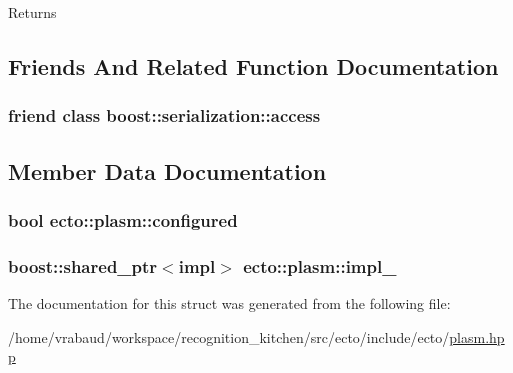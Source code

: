 \begin{DoxyReturn}{Returns}

\end{DoxyReturn}


\subsection{Friends And Related Function Documentation}
\subsubsection[{\texorpdfstring{boost\+::serialization\+::access}{boost::serialization::access}}]{\setlength{\rightskip}{0pt plus 5cm}friend class boost\+::serialization\+::access\hspace{0.3cm}{\ttfamily [friend]}}\hypertarget{structecto_1_1plasm_ac98d07dd8f7b70e16ccb9a01abf56b9c}{}\label{structecto_1_1plasm_ac98d07dd8f7b70e16ccb9a01abf56b9c}


\subsection{Member Data Documentation}
\subsubsection[{\texorpdfstring{configured}{configured}}]{\setlength{\rightskip}{0pt plus 5cm}bool ecto\+::plasm\+::configured\hspace{0.3cm}{\ttfamily [private]}}\hypertarget{structecto_1_1plasm_a8d074da8290587fab0ed04d5cfe3f6b1}{}\label{structecto_1_1plasm_a8d074da8290587fab0ed04d5cfe3f6b1}
\subsubsection[{\texorpdfstring{impl\+\_\+}{impl_}}]{\setlength{\rightskip}{0pt plus 5cm}boost\+::shared\+\_\+ptr$<$impl$>$ ecto\+::plasm\+::impl\+\_\+\hspace{0.3cm}{\ttfamily [private]}}\hypertarget{structecto_1_1plasm_a4cfd41e9dc82039a75970755565b2513}{}\label{structecto_1_1plasm_a4cfd41e9dc82039a75970755565b2513}


The documentation for this struct was generated from the following file\+:\begin{DoxyCompactItemize}
\item 
/home/vrabaud/workspace/recognition\+\_\+kitchen/src/ecto/include/ecto/\hyperlink{plasm_8hpp}{plasm.\+hpp}\end{DoxyCompactItemize}
